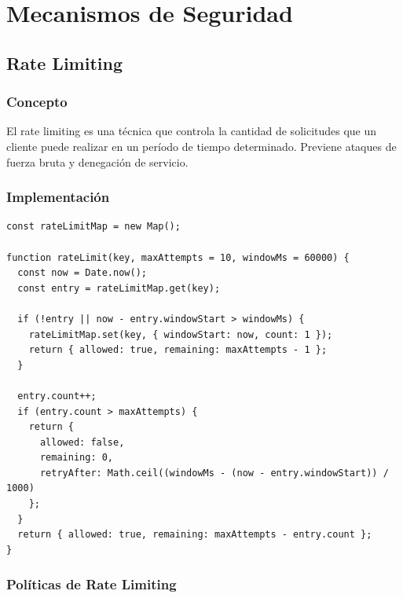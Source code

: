 \documentclass[12pt,a4paper,openany]{article}
\begin{document}
\section{Mecanismos de Seguridad}

\subsection{Rate Limiting}

\subsubsection{Concepto}

El rate limiting es una técnica que controla la cantidad de solicitudes que un cliente puede realizar en un período de tiempo determinado. Previene ataques de fuerza bruta y denegación de servicio.

\subsubsection{Implementación}

\begin{lstlisting}[style=jsstyle, caption={Implementación de Rate Limiting}]
const rateLimitMap = new Map();

function rateLimit(key, maxAttempts = 10, windowMs = 60000) {
  const now = Date.now();
  const entry = rateLimitMap.get(key);
  
  if (!entry || now - entry.windowStart > windowMs) {
    rateLimitMap.set(key, { windowStart: now, count: 1 });
    return { allowed: true, remaining: maxAttempts - 1 };
  }
  
  entry.count++;
  if (entry.count > maxAttempts) {
    return {
      allowed: false,
      remaining: 0,
      retryAfter: Math.ceil((windowMs - (now - entry.windowStart)) / 1000)
    };
  }
  return { allowed: true, remaining: maxAttempts - entry.count };
}
\end{lstlisting}

\subsubsection{Políticas de Rate Limiting}
\end{document}
